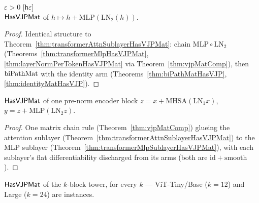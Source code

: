 \begin{theorem}
  \label{thm:transformerMlpSublayerHasVJPMat}
  \leanok
  \Assume{} \(\varepsilon > 0\) \hfill[\texttt{h\(\varepsilon\)}]\\
  \Prove{} \(\mathsf{HasVJPMat}\) of
  \(h \mapsto h + \mathrm{MLP}(\mathrm{LN}_2(h))\).
\end{theorem}

\begin{proof}
\leanok
Identical structure to
Theorem~\ref{thm:transformerAttnSublayerHasVJPMat}: chain
\(\mathrm{MLP} \circ \mathrm{LN}_2\)
(Theorems~\ref{thm:transformerMlpHasVJPMat},
\ref{thm:layerNormPerTokenHasVJPMat} via
Theorem~\ref{thm:vjpMatComp}), then \(\operatorname{biPathMat}\) with the
identity arm (Theorems~\ref{thm:biPathMatHasVJP},
\ref{thm:identityMatHasVJP}). \Qed{}
\end{proof}

\begin{theorem}
  \label{thm:transformerBlockHasVJPMat}
  \leanok
  \Prove{} \(\mathsf{HasVJPMat}\) of one pre-norm encoder block
  \(z = x + \mathrm{MHSA}(\mathrm{LN}_1 x)\),
  \(y = z + \mathrm{MLP}(\mathrm{LN}_2 z)\).
\end{theorem}

\begin{proof}
\leanok
One matrix chain rule (Theorem~\ref{thm:vjpMatComp}) glueing the
attention sublayer
(Theorem~\ref{thm:transformerAttnSublayerHasVJPMat}) to the MLP
sublayer (Theorem~\ref{thm:transformerMlpSublayerHasVJPMat}),
with each sublayer's flat differentiability discharged from its
arms (both are \(\mathrm{id} + \text{smooth}\)). \Qed{}
\end{proof}

\begin{theorem}
  \label{thm:transformerTowerHasVJPMat}
  \leanok
  \Prove{} \(\mathsf{HasVJPMat}\) of the \(k\)-block tower, for every
  \(k\) --- ViT-Tiny/Base (\(k = 12\)) and Large (\(k = 24\)) are
  instances.
\end{theorem}

